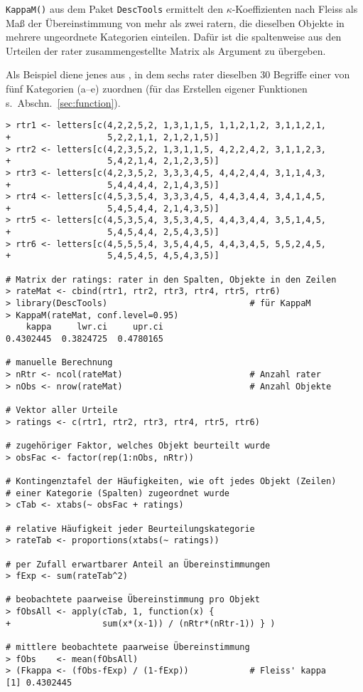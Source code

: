 \lstinline!KappaM()! aus dem Paket \lstinline!DescTools! ermittelt den $\kappa$-Koeffizienten nach Fleiss als Maß der Übereinstimmung von mehr als zwei ratern, die dieselben Objekte in mehrere ungeordnete Kategorien einteilen. Dafür ist die spaltenweise aus den Urteilen der rater zusammengestellte Matrix als Argument zu übergeben.

Als Beispiel diene jenes aus , in dem sechs rater dieselben $30$ Begriffe einer von fünf Kategorien (a--e) zuordnen (für das Erstellen eigener Funktionen s.\ Abschn.\ \ref{sec:function}).
\begin{lstlisting}
> rtr1 <- letters[c(4,2,2,5,2, 1,3,1,1,5, 1,1,2,1,2, 3,1,1,2,1,
+                   5,2,2,1,1, 2,1,2,1,5)]
> rtr2 <- letters[c(4,2,3,5,2, 1,3,1,1,5, 4,2,2,4,2, 3,1,1,2,3,
+                   5,4,2,1,4, 2,1,2,3,5)]
> rtr3 <- letters[c(4,2,3,5,2, 3,3,3,4,5, 4,4,2,4,4, 3,1,1,4,3,
+                   5,4,4,4,4, 2,1,4,3,5)]
> rtr4 <- letters[c(4,5,3,5,4, 3,3,3,4,5, 4,4,3,4,4, 3,4,1,4,5,
+                   5,4,5,4,4, 2,1,4,3,5)]
> rtr5 <- letters[c(4,5,3,5,4, 3,5,3,4,5, 4,4,3,4,4, 3,5,1,4,5,
+                   5,4,5,4,4, 2,5,4,3,5)]
> rtr6 <- letters[c(4,5,5,5,4, 3,5,4,4,5, 4,4,3,4,5, 5,5,2,4,5,
+                   5,4,5,4,5, 4,5,4,3,5)]

# Matrix der ratings: rater in den Spalten, Objekte in den Zeilen
> rateMat <- cbind(rtr1, rtr2, rtr3, rtr4, rtr5, rtr6)
> library(DescTools)                            # für KappaM
> KappaM(rateMat, conf.level=0.95)
    kappa     lwr.ci     upr.ci
0.4302445  0.3824725  0.4780165

# manuelle Berechnung
> nRtr <- ncol(rateMat)                         # Anzahl rater
> nObs <- nrow(rateMat)                         # Anzahl Objekte

# Vektor aller Urteile
> ratings <- c(rtr1, rtr2, rtr3, rtr4, rtr5, rtr6)

# zugehöriger Faktor, welches Objekt beurteilt wurde
> obsFac <- factor(rep(1:nObs, nRtr))

# Kontingenztafel der Häufigkeiten, wie oft jedes Objekt (Zeilen)
# einer Kategorie (Spalten) zugeordnet wurde
> cTab <- xtabs(~ obsFac + ratings)

# relative Häufigkeit jeder Beurteilungskategorie
> rateTab <- proportions(xtabs(~ ratings))

# per Zufall erwartbarer Anteil an Übereinstimmungen
> fExp <- sum(rateTab^2)

# beobachtete paarweise Übereinstimmung pro Objekt
> fObsAll <- apply(cTab, 1, function(x) {
+                  sum(x*(x-1)) / (nRtr*(nRtr-1)) } )

# mittlere beobachtete paarweise Übereinstimmung
> fObs    <- mean(fObsAll)
> (Fkappa <- (fObs-fExp) / (1-fExp))            # Fleiss' kappa
[1] 0.4302445
\end{lstlisting}

